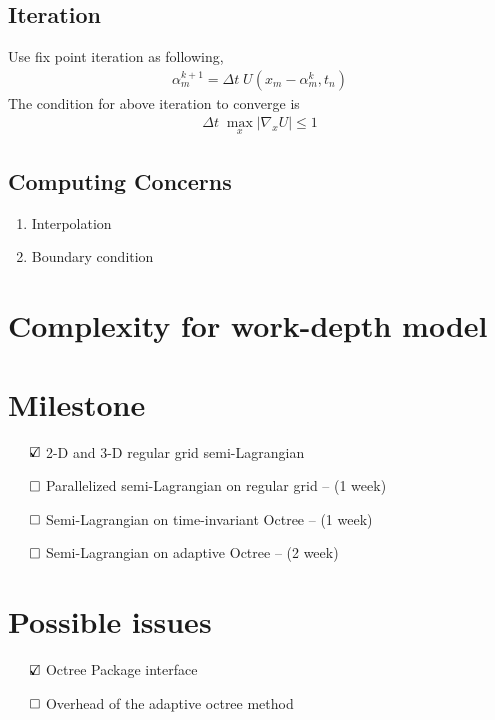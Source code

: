 \documentclass[PROP,PDF]{prop} %
\def\checkbox{\indent\text{\rlap{$\checkmark$}}\square}
\def\uncheckbox{\indent\square}
\begin{document}
\subsection{Iteration}
Use fix point iteration as following,
\begin{eqnarray}
\alpha_{m}^{k+1} = \Delta t\; U (x_m - \alpha_m^{k},t_n)
\end{eqnarray}
The condition for above iteration to converge is
\begin{eqnarray}
\Delta t \; \max_x |\nabla_x U| \le 1
\end{eqnarray}
\subsection{Computing Concerns}
\begin{enumerate}
\item Interpolation
\item Boundary condition
\end{enumerate}

\section{Complexity for work-depth model}

\section{Milestone}
\begin{description}
\item $\checkbox$ 2-D and 3-D regular grid semi-Lagrangian
\item $\uncheckbox$ Parallelized semi-Lagrangian on regular grid -- (1 week)
\item $\uncheckbox$ Semi-Lagrangian on time-invariant Octree -- (1 week)
\item $\uncheckbox$ Semi-Lagrangian on adaptive Octree -- (2 week)
\end{description}

\section{Possible issues}
\begin{description}
\item $\checkbox$ Octree Package interface
\item $\uncheckbox$ Overhead of the adaptive octree method
\end{description}
\end{document}
